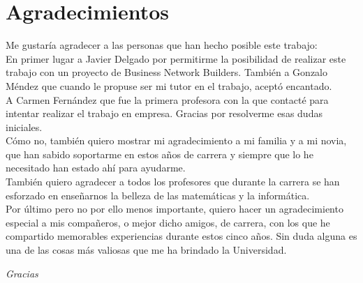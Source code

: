 \chapter*{Agradecimientos}
	Me gustaría agradecer a las personas que han hecho posible este trabajo:\\
	
	En primer lugar a Javier Delgado por permitirme la posibilidad de realizar este trabajo con un proyecto de Business Network Builders.
	También a Gonzalo Méndez que cuando le propuse ser mi tutor en el trabajo, aceptó encantado.\\

	A Carmen Fernández que fue la primera profesora con la que contacté para intentar realizar el trabajo en empresa.
	Gracias por resolverme esas dudas iniciales.\\
	
	Cómo no, también quiero mostrar mi agradecimiento a mi familia y a mi novia, 
	que han sabido soportarme en estos años de carrera y siempre que lo he necesitado han estado ahí para ayudarme.\\
	
	También quiero agradecer a todos los profesores que durante la carrera se han esforzado en enseñarnos la belleza de las matemáticas y la informática.\\
	
	Por último pero no por ello menos importante, quiero hacer un agradecimiento especial a mis compañeros, o mejor dicho amigos, de carrera, 
	con los que he compartido memorables experiencias durante estos cinco años. Sin duda alguna es una de las cosas más valiosas que me ha brindado la Universidad.\\
	
	
	\begin{center}
		\textit{Gracias}
	\end{center}
	
	
	
	

		
